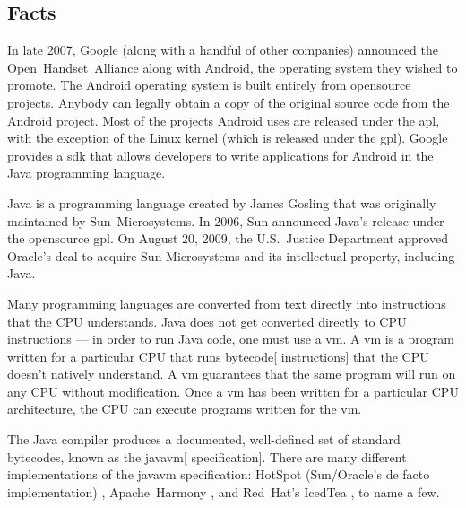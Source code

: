 \documentclass[11pt]{article}
\begin{document}
\begin{multicols}{2}

\section{Facts} %
\label{sec:facts}

In late 2007, Google (along with a handful of other companies) announced the
Open~Handset~Alliance \cite{open-handset-alliance-ann} along with Android, the
operating system they wished to promote.  The Android operating system is built
entirely from \gls{opensource} projects.  Anybody can legally obtain a copy of
the original source code from the Android project.  Most of the projects Android
uses are released under the \gls{apl}, with the exception of the Linux kernel
(which is released under the \gls{gpl}).  Google provides a \gls{sdk} that
allows developers to write applications for Android in the Java programming
language. \cite{android-sdk-building}

Java is a programming language created by James Gosling that was originally
maintained by Sun~Microsystems.  In 2006, Sun announced Java's release under the
\gls{opensource} \gls{gpl}. \cite{sun-open-sources-java} On August 20, 2009, the
U.S.~Justice Department approved Oracle's deal to acquire Sun Microsystems and
its intellectual property, including Java. \cite{oracle-buys-sun}

Many programming languages are converted from text directly into instructions
that the CPU understands.  Java does not get converted directly to CPU
instructions --- in order to run Java code, one must use a \gls{vm}.
\cite[Chapter 1]{javavm-bytecode}  A \gls{vm} is a program written for a
particular CPU that runs \gls{bytecode}[ instructions] that the CPU doesn't
natively understand.  A \gls{vm} guarantees that the same program will run on
any CPU without modification.  Once a \gls{vm} has been written for a particular
CPU architecture, the CPU can execute programs written for the \gls{vm}.

The Java compiler produces a documented, well-defined set of standard
\glspl{bytecode}, known as the \gls{javavm}[ specification]. \cite[Chapter
4]{javavm-bytecode}  There are many different implementations of the
\gls{javavm} specification: HotSpot (Sun/Oracle's de facto implementation)
\cite{hotspot}, Apache~Harmony \cite{apache-harmony}, and Red~Hat's IcedTea
\cite{icedtea}, to name a few.


\end{multicols}
\end{document}
